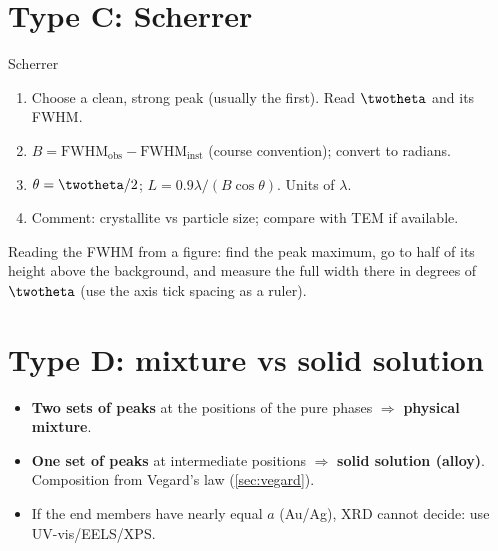 \section{Type C: Scherrer}
\begin{recipe}{Scherrer}
\begin{enumerate}
  \item Choose a clean, strong peak (usually the first). Read $\twotheta$ and its FWHM.
  \item $B = \mathrm{FWHM}_\mathrm{obs} - \mathrm{FWHM}_\mathrm{inst}$ (course convention); convert to radians.
  \item $\theta = \twotheta/2$; $L = 0.9\lambda/(B\cos\theta)$. Units of $\lambda$.
  \item Comment: crystallite vs particle size; compare with TEM if available.
\end{enumerate}
\end{recipe}
Reading the FWHM from a figure: find the peak maximum, go to half of its height above the background, and measure the full
width there in degrees of $\twotheta$ (use the axis tick spacing as a ruler).

\section{Type D: mixture vs solid solution}
\begin{keybox}
\begin{itemize}
  \item \textbf{Two sets of peaks} at the positions of the pure phases $\Rightarrow$ \textbf{physical mixture}.
  \item \textbf{One set of peaks} at intermediate positions $\Rightarrow$ \textbf{solid solution (alloy)}. Composition
        from Vegard's law (\cref{sec:vegard}).
  \item If the end members have nearly equal $a$ (Au/Ag), XRD cannot decide: use UV-vis/EELS/XPS.
\end{itemize}
\end{keybox}

